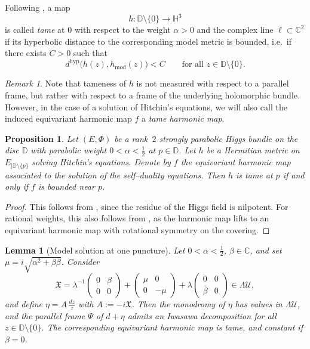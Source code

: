 \documentclass[12pt,a4paper]{amsart}
\newtheorem{lemma}[theorem]{Lemma}
\newtheorem{proposition}[theorem]{Proposition}
\theoremstyle{definition}
\theoremstyle{remark}
\newtheorem{remark}[theorem]{Remark}
\newcommand{\C}{\mathbb C}
\begin{document}
Following \cite{Sim2}, a map
\[
h\colon \mathbb D\setminus\{0\}\longrightarrow \mathbb H^3
\]
is called \emph{tame} at $0$ with respect to the weight $\alpha>0$ and the
complex line $\ell\subset\C^2$ if its hyperbolic distance to the
corresponding model metric is bounded, i.e.\ if there exists $C>0$ such that
\[
d^{\mathrm{hyp}}\bigl(h(z),h_{\mathrm{mod}}(z)\bigr)< C
\qquad
\text{for all } z\in \mathbb D\setminus\{0\}.
\]



\begin{remark}
Note that
tameness of $h$ is not measured with respect to a parallel frame, but rather with respect
to a frame of the underlying holomorphic bundle.
However, in the case of a solution of Hitchin's equations, we will also call the induced
equivariant harmonic map $f$ a \emph{tame harmonic map}.
\end{remark}

\begin{proposition}\label{prop:tame-bounded-cover}
Let $(E,\Phi)$ be a rank~$2$ strongly parabolic Higgs bundle on the disc $\mathbb D$ with parabolic
weight $0<\alpha<\tfrac{1}{2}$ at $p \in \mathbb D$. Let $h$ be a Hermitian metric on
$E_{\mid \mathbb D\setminus \{p\}}$ solving Hitchin's equations.
Denote by $f$ the equivariant harmonic map
 associated to the solution of the self--duality equations.
Then $h$ is tame at $p$ if and only if $f$ is bounded near $p$.
\end{proposition}

\begin{proof}
This follows from \cite[Section~7]{Sim2}, since the residue of the Higgs field is
nilpotent.
For rational weights, this also follows from \cite{Nas}, as the harmonic map lifts
to an equivariant harmonic map with rotational symmetry on the covering.
\end{proof}



\begin{lemma}[Model solution at one puncture]\label{lem:analysisononeleg}
Let $0<\alpha<\tfrac{1}{2}$, $\beta\in\C$, and set $\mu=i\sqrt{\alpha^2+\beta\bar\beta}$.
Consider
\begin{equation}\label{eq:mfx}
\mathfrak X
=
\lambda^{-1}
\begin{pmatrix}
0 & \beta \\
0 & 0
\end{pmatrix}
+
\begin{pmatrix}
\mu & 0 \\
0 & -\mu
\end{pmatrix}
+
\lambda
\begin{pmatrix}
0 & 0 \\
\bar\beta & 0
\end{pmatrix}
\in
\Lambda\mathcal U,
\end{equation}
and define $\eta=A\,\tfrac{dz}{z}$ with $A:=-i\mathfrak X$.
Then the monodromy of $\eta$ has values in $\Lambda\mathcal U$, and the parallel
frame $\Psi$ of $d+\eta$ admits an Iwasawa decomposition for all
$z\in\mathbb D\setminus\{0\}$.
The corresponding equivariant harmonic map is tame, and constant if $\beta=0$.
\end{lemma}
\end{document}
